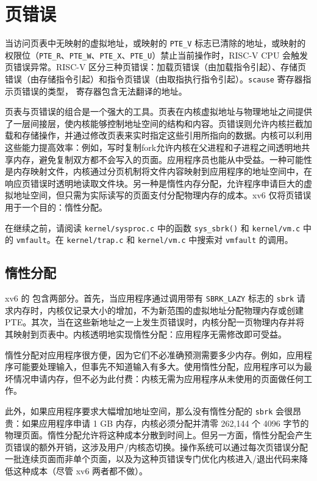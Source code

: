 \chapter{页错误}
\label{CH:PGFAULTS}

当访问页表中无映射的虚拟地址，或映射的 \lstinline{PTE_V} 标志已清除的地址，或映射的权限位（\lstinline{PTE_R}、\lstinline{PTE_W}、\lstinline{PTE_X}、\lstinline{PTE_U}）禁止当前操作时，RISC-V CPU 会触发页错误异常。RISC-V 区分三种页错误：加载页错误（由加载指令引起）、存储页错误（由存储指令引起）和指令页错误（由取指执行指令引起）。\lstinline{scause} 寄存器指示页错误的类型， 寄存器包含无法翻译的地址。

页表与页错误的组合是一个强大的工具。页表在内核虚拟地址与物理地址之间提供了一层间接层，使内核能够控制地址空间的结构和内容。页错误则允许内核拦截加载和存储操作，并通过修改页表来实时指定这些引用所指向的数据。内核可以利用这些能力提高效率：例如，写时复制fork允许内核在父进程和子进程之间透明地共享内存，避免复制双方都不会写入的页面。应用程序员也能从中受益。一种可能性是内存映射文件，内核通过分页机制将文件内容映射到应用程序的地址空间中，在响应页错误时透明地读取文件块。另一种是惰性内存分配，允许程序申请巨大的虚拟地址空间，但只需为实际读写的页面支付分配物理内存的成本。xv6 仅将页错误用于一个目的：惰性分配。

在继续之前，请阅读 {\tt kernel/sysproc.c} 中的函数 {\tt sys\_sbrk()} 和 {\tt kernel/vm.c} 中的 {\tt vmfault}。在 {\tt kernel/trap.c} 和 {\tt kernel/vm.c} 中搜索对 {\tt vmfault} 的调用。

\section{惰性分配}
\label{sec:lazy}

xv6 的  包含两部分。首先，当应用程序通过调用带有 \lstinline{SBRK_LAZY} 标志的 \lstinline{sbrk} 请求内存时，内核仅记录大小的增加，不为新范围的虚拟地址分配物理内存或创建 PTE。其次，当在这些新地址之一上发生页错误时，内核分配一页物理内存并将其映射到页表中。内核透明地实现惰性分配：应用程序无需修改即可受益。

惰性分配对应用程序很方便，因为它们不必准确预测需要多少内存。例如，应用程序可能要处理输入，但事先不知道输入有多大。使用惰性分配，应用程序可以为最坏情况申请内存，但不必为此付费：内核无需为应用程序从未使用的页面做任何工作。

此外，如果应用程序要求大幅增加地址空间，那么没有惰性分配的 \lstinline{sbrk} 会很昂贵：如果应用程序申请 1 GB 内存，内核必须分配并清零 262,144 个 4096 字节的物理页面。惰性分配允许将这种成本分散到时间上。但另一方面，惰性分配会产生页错误的额外开销，这涉及用户/内核态切换。操作系统可以通过每次页错误分配一批连续页面而非单个页面，以及为这种页错误专门优化内核进入/退出代码来降低这种成本（尽管 xv6 两者都不做）。

